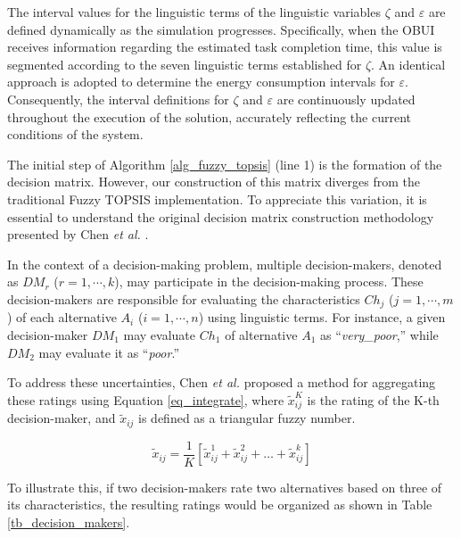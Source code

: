 \documentclass[iicol]{sn-jnl}
\begin{document}
The interval values for the linguistic terms of the linguistic variables $\zeta$ and $\varepsilon$ are defined dynamically as the simulation progresses. Specifically, when the OBUI receives information regarding the estimated task completion time, this value is segmented according to the seven linguistic terms established for $\zeta$. An identical approach is adopted to determine the energy consumption intervals for $\varepsilon$. Consequently, the interval definitions for $\zeta$ and $\varepsilon$ are continuously updated throughout the execution of the solution, accurately reflecting the current conditions of the system.

The initial step of Algorithm \ref{alg_fuzzy_topsis} (line 1) is the formation of the decision matrix. However, our construction of this matrix diverges from the traditional Fuzzy TOPSIS implementation. To appreciate this variation, it is essential to understand the original decision matrix construction methodology presented by Chen \textit{et al.} \cite{CHEN20001}.

In the context of a decision-making problem, multiple decision-makers, denoted as $DM_r$ ($r=1,\cdots,k$), may participate in the decision-making process. These decision-makers are responsible for evaluating the characteristics $Ch_j$ ($j=1,\cdots,m$) of each alternative $A_i$ ($i=1,\cdots,n$) using linguistic terms. For instance, a given decision-maker $DM_1$ may evaluate $Ch_1$ of alternative $A_1$ as ``\textit{very\_poor},'' while $DM_2$ may evaluate it as ``\textit{poor}.''

To address these uncertainties, Chen \textit{et al.} \cite{CHEN20001} proposed a method for aggregating these ratings using Equation \eqref{eq_integrate}, where $\tilde{x}_{ij}^K$ is the rating of the K-th decision-maker, and $\tilde{x}_{ij}$ is defined as a triangular fuzzy number.

\begin{equation}\label{eq_integrate}
    \tilde{x}_{ij} = \frac{1}{K} \left[ \tilde{x}_{ij}^1 + \tilde{x}_{ij}^2 + \dots + \tilde{x}_{ij}^k \right]
\end{equation}

To illustrate this, if two decision-makers rate two alternatives based on three of its characteristics, the resulting ratings would be organized as shown in Table \ref{tb_decision_makers}.

\newlength{\fivecolumns}
\setlength{\fivecolumns}{\dimexpr\columnwidth/5\relax} 
\end{document}
